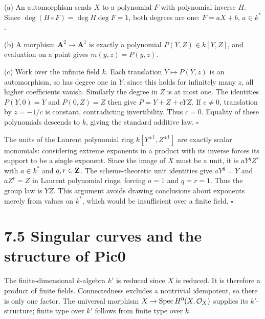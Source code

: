 \documentclass[11pt]{article}
\let\chapterexercise\exercise
\renewcommand{\exercise}[2]{\Needspace{8\baselineskip}\chapterexercise{#1}{#2}}
\begin{document}
\pf
(a) An automorphism sends $X$ to a polynomial $F$ with polynomial inverse $H$. Since $\deg(H\circ F)=\deg H\deg F=1$, both degrees are one: $F=aX+b$, $a\in k^*$.

(b) A morphism $\mathbf A^2\to\mathbf A^1$ is exactly a polynomial $P(Y,Z)\in k[Y,Z]$, and evaluation on a point gives $m(y,z)=P(y,z)$.

(c) Work over the infinite field $\bar k$. Each translation $Y\mapsto P(Y,z)$ is an automorphism, so has degree one in $Y$; since this holds for infinitely many $z$, all higher coefficients vanish. Similarly the degree in $Z$ is at most one. The identities $P(Y,0)=Y$ and $P(0,Z)=Z$ then give $P=Y+Z+cYZ$. If $c\ne0$, translation by $z=-1/c$ is constant, contradicting invertibility. Thus $c=0$. Equality of these polynomials descends to $k$, giving the standard additive law. \hfill$\square$

\pf
The units of the Laurent polynomial ring $k[Y^{\pm1},Z^{\pm1}]$ are exactly scalar monomials: considering extreme exponents in a product with its inverse forces its support to be a single exponent. Since the image of $X$ must be a unit, it is $aY^qZ^r$ with $a\in k^*$ and $q,r\in\mathbf Z$. The scheme-theoretic unit identities give $aY^q=Y$ and $aZ^r=Z$ in Laurent polynomial rings, forcing $a=1$ and $q=r=1$. Thus the group law is $YZ$. This argument avoids drawing conclusions about exponents merely from values on $k^*$, which would be insufficient over a finite field. \hfill$\square$

\section*{7.5 Singular curves and the structure of Pic0}

\pf
The finite-dimensional $k$-algebra $k'$ is reduced since $X$ is reduced. It is therefore a product of finite fields. Connectedness excludes a nontrivial idempotent, so there is only one factor. The universal morphism $X\to\operatorname{Spec} H^0(X,\mathcal O_X)$ supplies its $k'$-structure; finite type over $k'$ follows from finite type over $k$.
\end{document}
